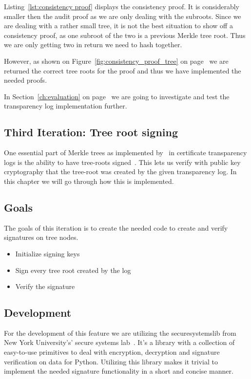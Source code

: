 \documentclass[../Main/thesis.tex]{subfiles}
\begin{document}
Listing~\ref{lst:consistency proof} displays the consistency proof. It is
considerably smaller then the audit proof as we are only dealing with the
subroots. Since we are dealing with a rather small tree, it is not the best
situation to show off a consistency proof, as one subroot of the two is a
previous Merkle tree root. Thus we are only getting two in return we need to
hash together. 

However, as shown on Figure~\ref{fig:consistency_proof_tree} on
page~\pageref{fig:consistency_proof_tree} we are returned the correct tree roots
for the proof and thus we have implemented the needed proofs.

In Section~\ref{ch:evaluation} on page~\pageref{ch:evaluation} we are going to
investigate and test the transparency log implementation further.

\subsection{Third Iteration: Tree root signing}%
\label{sub:tree_root_signing}
One essential part of Merkle trees as implemented
by~\citeauthor{b.-laurie-a.-langley-e.kaster-google-2013} in certificate
transparency logs is the ability to have tree-roots
signed~\cite{b.-laurie-a.-langley-e.kaster-google-2013}. This lets us verify
with public key cryptography that the tree-root was created by the given
transparency log. In this chapter we will go through how this is implemented.

\subsection*{Goals}%
\label{sub:third_iteration_goals}

The goals of this iteration is to create the needed code to create and verify
signatures on tree nodes.

\begin{itemize}
    \item Initialize signing keys
    \item Sign every tree root created by the log
    \item Verify the signature
\end{itemize}

\subsection*{Development}%
\label{sub:third_iteration_development}
For the development of this feature we are utilizing the securesystemslib from
New York University's' secure systems lab~\cite{securesystemslib}. It's a
library with a collection of easy-to-use primitives to deal with encryption,
decryption and signature verification on data for Python. Utilizing this library
makes it trivial to implement the needed signature functionality in a short and
concise manner.
\end{document}
